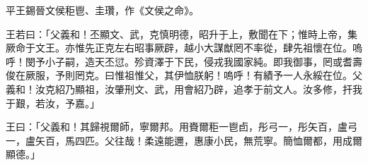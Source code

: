 
\begin{pinyinscope}
平王錫晉文侯秬鬯、圭瓚，作《文侯之命》。

王若曰：「父義和！丕顯文、武，克慎明德，昭升于上，敷聞在下；惟時上帝，集厥命于文王。亦惟先正克左右昭事厥辟，越小大謀猷罔不率從，肆先祖懷在位。嗚呼！閔予小子嗣，造天丕愆。殄資澤于下民，侵戎我國家純。即我御事，罔或耆壽俊在厥服，予則罔克。曰惟祖惟父，其伊恤朕躬！嗚呼！有績予一人永綏在位。父義和！汝克紹乃顯祖，汝肇刑文、武，用會紹乃辟，追孝于前文人。汝多修，扞我于艱，若汝，予嘉。」

王曰：「父義和！其歸視爾師，寧爾邦。用賚爾秬一鬯卣，彤弓一，彤矢百，盧弓一，盧矢百，馬四匹。父往哉！柔遠能邇，惠康小民，無荒寧。簡恤爾都，用成爾顯德。」


\end{pinyinscope}